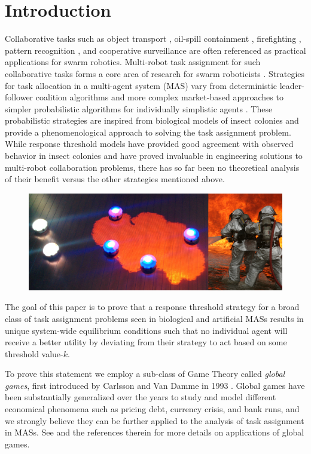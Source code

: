 \documentclass[conference]{ieeeconf}
\begin{document}
\section{Introduction}\label{sec:intro}
Collaborative tasks such as object transport \cite{Sugawara2012}, oil-spill containment \cite{Beni2005}, firefighting \cite{Krishnanand2006}, pattern recognition \cite{Beni1993}, and cooperative surveillance are often referenced as practical applications for swarm robotics. Multi-robot task assignment for such collaborative tasks forms a core area of research for swarm roboticists \cite{Gerkey2004}. Strategies for task allocation in a multi-agent system (MAS) vary from deterministic leader-follower coalition algorithms \cite{Chen2011} and more complex market-based approaches \cite{Amstutz2008,Vig2007} to simpler probabilistic algorithms for individually simplistic agents \cite{Dantu2012}. These probabilistic strategies are inspired from biological models of insect colonies and provide a phenomenological approach to solving the task assignment problem. While response threshold models have provided good agreement with observed behavior in insect colonies and have proved invaluable in engineering solutions to multi-robot collaboration problems, there has so far been no theoretical analysis of their benefit versus the other strategies mentioned above.

\begin{figure}[!ht]
\centering\includegraphics[width=\textwidth]{../figures/dropletfire.png}
\centering\caption{}\label{fig:dropletfire}
\end{figure}

The goal of this paper is to prove that a response threshold strategy for a broad class of task assignment problems seen in biological and artificial MASs results in unique system-wide equilibrium conditions such that no individual agent will receive a better utility by deviating from their strategy to act based on some threshold value-$k$. 

To prove this statement we employ a sub-class of Game Theory called \emph{global games}, first introduced by Carlsson and Van Damme in 1993 \cite{Carlsson1993}. Global games have been substantially generalized over the years to study and model different economical phenomena such as pricing debt, currency crisis, and bank runs, and we strongly believe they can be further applied to the analysis of task assignment in MASs. See \cite{Morris2000} and the references therein for more details on applications of global games.
\end{document}
